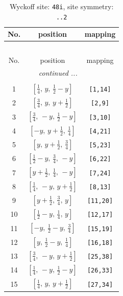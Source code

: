 \documentclass[fleqn,8pt]{jsarticle}
\begin{document}
\renewcommand{\arraystretch}{1.2}
\begin{longtable}{ccc}
\caption{Wyckoff site: {\tt 48i}, site symmetry: {\tt ..2}}
 \\
 \hline \hline
No. & position & mapping \\ \hline \endfirsthead

\multicolumn{2}{l}{\tablename\ \thetable{}} \\
 \hline \hline
No. & position & mapping \\ \hline \endhead

 \hline \hline
\multicolumn{2}{r}{\footnotesize\it continued ...} \\ \endfoot

 \hline \hline
\multicolumn{2}{r}{} \\ \endlastfoot

1 & $\left[ \frac{1}{4},\, y,\, \frac{1}{2} - y \right]$ & {\tt [1,14]} \\ \hline
2 & $\left[ \frac{3}{4},\, y,\, y + \frac{1}{2} \right]$ & {\tt [2,9]} \\ \hline
3 & $\left[ \frac{3}{4},\, - y,\, \frac{1}{2} - y \right]$ & {\tt [3,10]} \\ \hline
4 & $\left[ - y,\, y + \frac{1}{2},\, \frac{1}{4} \right]$ & {\tt [4,21]} \\ \hline
5 & $\left[ y,\, y + \frac{1}{2},\, \frac{3}{4} \right]$ & {\tt [5,23]} \\ \hline
6 & $\left[ \frac{1}{2} - y,\, \frac{3}{4},\, - y \right]$ & {\tt [6,22]} \\ \hline
7 & $\left[ y + \frac{1}{2},\, \frac{1}{4},\, - y \right]$ & {\tt [7,24]} \\ \hline
8 & $\left[ \frac{1}{4},\, - y,\, y + \frac{1}{2} \right]$ & {\tt [8,13]} \\ \hline
9 & $\left[ y + \frac{1}{2},\, \frac{3}{4},\, y \right]$ & {\tt [11,20]} \\ \hline
10 & $\left[ \frac{1}{2} - y,\, \frac{1}{4},\, y \right]$ & {\tt [12,17]} \\ \hline
11 & $\left[ - y,\, \frac{1}{2} - y,\, \frac{3}{4} \right]$ & {\tt [15,19]} \\ \hline
12 & $\left[ y,\, \frac{1}{2} - y,\, \frac{1}{4} \right]$ & {\tt [16,18]} \\ \hline
13 & $\left[ \frac{3}{4},\, - y,\, y + \frac{1}{2} \right]$ & {\tt [25,38]} \\ \hline
14 & $\left[ \frac{1}{4},\, - y,\, \frac{1}{2} - y \right]$ & {\tt [26,33]} \\ \hline
15 & $\left[ \frac{1}{4},\, y,\, y + \frac{1}{2} \right]$ & {\tt [27,34]} \\ \hline

\end{longtable}
\end{document}

